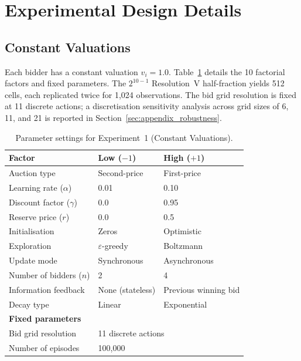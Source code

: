 \section{Experimental Design Details}
\label{sec:appendix_design}

\subsection{Constant Valuations}

Each bidder has a constant valuation $v_i=1.0$. Table~\ref{tab:exp1params} details the 10 factorial factors and fixed parameters. The $2^{10-1}$ Resolution~V half-fraction yields 512 cells, each replicated twice for 1{,}024 observations. The bid grid resolution is fixed at 11 discrete actions; a discretisation sensitivity analysis across grid sizes of 6, 11, and 21 is reported in Section~\ref{sec:appendix_robustness}.

\begin{table}[h]
\centering
\caption{Parameter settings for Experiment~1 (Constant Valuations).}
\label{tab:exp1params}
\begin{tabular}{l l l}
\toprule
\textbf{Factor} & \textbf{Low ($-1$)} & \textbf{High ($+1$)}\\
\midrule
Auction type & Second-price & First-price \\
Learning rate ($\alpha$) & 0.01 & 0.10 \\
Discount factor ($\gamma$) & 0.0 & 0.95 \\
Reserve price ($r$) & 0.0 & 0.5 \\
Initialisation & Zeros & Optimistic \\
Exploration & $\varepsilon$-greedy & Boltzmann \\
Update mode & Synchronous & Asynchronous \\
Number of bidders ($n$) & 2 & 4 \\
Information feedback & None (stateless) & Previous winning bid \\
Decay type & Linear & Exponential \\
\midrule
\multicolumn{3}{l}{\textbf{Fixed parameters}} \\
\midrule
Bid grid resolution & \multicolumn{2}{l}{11 discrete actions\footnotemark} \\
Number of episodes & \multicolumn{2}{l}{100{,}000} \\
\bottomrule
\end{tabular}
\end{table}

